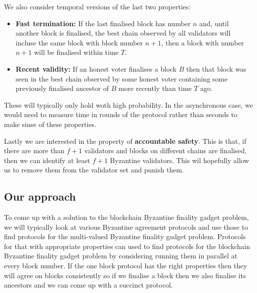 \documentclass{article}
\begin{document}
We also consider temporal versions of the last two properties:

\begin{itemize}
\item{\bf Fast termination:} If the last finalised block has number $n$ and, until another block is finalised, the best chain observed by all validators will incluse the same block with block number $n+1$, then a block with number $n+1$ will be finalised within time $T$.
\item{\bf Recent validity:} If an honest voter finalises a block $B$ then that block was seen in the best chain observed by some honest voter containing some previously finalised ancestor of $B$ more recently than time $T$ ago.
\end{itemize}
These will typically only hold woth high probability. In the asynchronous case, we would need to measure time in rounds of the protocol rather than seconds to make sinse of these properties.

Lastly we are interested in the property of {\bf accountable safety}. This is that, if there are more than $f+1$ validators and blocks on different chains are finalised, then we can identify at least $f+1$ Byzantine validators. This wil hopefully allow us to remove them from the validator set and punish them. 

\subsection{Our approach}

To come up with a solution to the blockchain Byzantine finality gadget problem, we will typically look at various Byzantine agreement protocols and use those to find protocols for the  multi-valued Byzantine finality gadget problem. Protocols for that with appropriate properties can used to find protocols for the blockchain Byzantine finality gadget problem by considering running them in parallel at every block number. If the one block protocol has the right properties then they will agree on blocks consistently so if we finalise a block then we also finalise its ancestors and we can come up with a succinct protocol.
\end{document}
